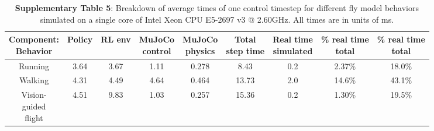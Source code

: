 \documentclass[sn-mathphys-num]{sn-jnl}%
\theoremstyle{thmstyleone}%
\theoremstyle{thmstyletwo}%
\theoremstyle{thmstylethree}%
\begin{document}
\begin{appendices}
\begin{table}[htbp]
	\centering
	\small
	\caption{\textbf{Supplementary Table 5}: 
		Breakdown of average times of one control timestep for different fly model behaviors simulated on a single core of Intel Xeon CPU E5-2697 v3 @ 2.60GHz. 
		All times are in units of ms.}
	\begin{tabular}{ccccccccc}
		\toprule
		\makecell{Component:\\Behavior}         &        Policy  & RL env  & \makecell{MuJoCo\\control}  & \makecell{MuJoCo\\physics} & \makecell{Total\\step time} & \makecell{Real time\\simulated} & \makecell{\% real time\\total} & \makecell{\% real time\\total} \\
		\midrule
		Running     &   3.64      &    3.67 & 1.11 & 0.278 & 8.43 & 0.2 & 2.37\% & 18.0\% \\
		\midrule
		Walking     &   4.31      &    4.49 & 4.64 & 0.464 & 13.73 & 2.0 & 14.6\% & 43.1\% \\
		\makecell{Vision-\\guided\\flight}     &   4.51      &    9.83 & 1.03 & 0.257 & 15.36 & 0.2 & 1.30\% & 19.5\% \\
		\bottomrule
	\end{tabular}%
	\label{tab:s_5}%
\end{table}%





\end{appendices}
\end{document}
